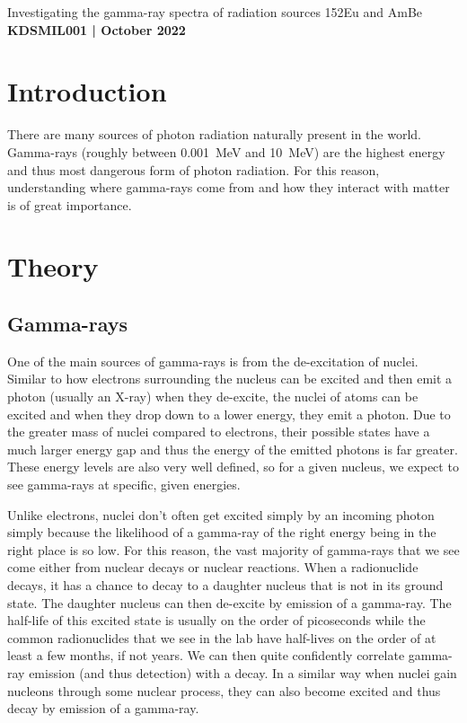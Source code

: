 \documentclass[11pt]{article}
\numberwithin{equation}{section}
\numberwithin{figure}{section}
\numberwithin{table}{section}
\begin{document}
\begin{center}
    {\huge Investigating the gamma-ray spectra of radiation sources 152Eu and AmBe}\\
    \vspace{0.2in}
    \textbf{KDSMIL001 | October 2022}
\end{center}


\section{Introduction}\label{sec:Introduction}
There are many sources of photon radiation naturally present in the world. Gamma-rays (roughly between \SI{0.001}{\mega\electronvolt} and \SI{10}{\mega\electronvolt}) are the highest energy and thus most dangerous form of photon radiation. For this reason, understanding where gamma-rays come from and how they interact with matter is of great importance. 

\section{Theory}\label{sec:Theory}

\subsection{Gamma-rays}\label{sec:GammaTheory}
One of the main sources of gamma-rays is from the de-excitation of nuclei. Similar to how electrons surrounding the nucleus can be excited and then emit a photon (usually an X-ray) when they de-excite, the nuclei of atoms can be excited and when they drop down to a lower energy, they emit a photon. Due to the greater mass of nuclei compared to electrons, their possible states have a much larger energy gap and thus the energy of the emitted photons is far greater. These energy levels are also very well defined, so for a given nucleus, we expect to see gamma-rays at specific, given energies. 

Unlike electrons, nuclei don't often get excited simply by an incoming photon simply because the likelihood of a gamma-ray of the right energy being in the right place is so low. For this reason, the vast majority of gamma-rays that we see come either from nuclear decays or nuclear reactions. When a radionuclide decays, it has a chance to decay to a daughter nucleus that is not in its ground state. The daughter nucleus can then de-excite by emission of a gamma-ray. The half-life of this excited state is usually on the order of picoseconds while the common radionuclides that we see in the lab have half-lives on the order of at least a few months, if not years. We can then quite confidently correlate gamma-ray emission (and thus detection) with a decay. In a similar way when nuclei gain nucleons through some nuclear process, they can also become excited and thus decay by emission of a gamma-ray. 
\end{document}
